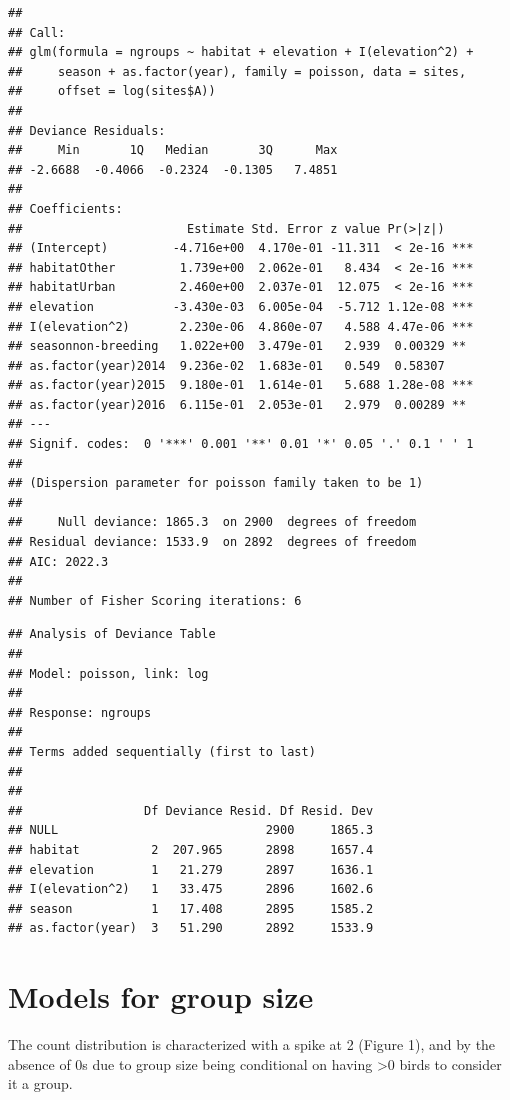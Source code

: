 \documentclass[]{article}
\begin{document}
\begin{verbatim}
## 
## Call:
## glm(formula = ngroups ~ habitat + elevation + I(elevation^2) + 
##     season + as.factor(year), family = poisson, data = sites, 
##     offset = log(sites$A))
## 
## Deviance Residuals: 
##     Min       1Q   Median       3Q      Max  
## -2.6688  -0.4066  -0.2324  -0.1305   7.4851  
## 
## Coefficients:
##                       Estimate Std. Error z value Pr(>|z|)    
## (Intercept)         -4.716e+00  4.170e-01 -11.311  < 2e-16 ***
## habitatOther         1.739e+00  2.062e-01   8.434  < 2e-16 ***
## habitatUrban         2.460e+00  2.037e-01  12.075  < 2e-16 ***
## elevation           -3.430e-03  6.005e-04  -5.712 1.12e-08 ***
## I(elevation^2)       2.230e-06  4.860e-07   4.588 4.47e-06 ***
## seasonnon-breeding   1.022e+00  3.479e-01   2.939  0.00329 ** 
## as.factor(year)2014  9.236e-02  1.683e-01   0.549  0.58307    
## as.factor(year)2015  9.180e-01  1.614e-01   5.688 1.28e-08 ***
## as.factor(year)2016  6.115e-01  2.053e-01   2.979  0.00289 ** 
## ---
## Signif. codes:  0 '***' 0.001 '**' 0.01 '*' 0.05 '.' 0.1 ' ' 1
## 
## (Dispersion parameter for poisson family taken to be 1)
## 
##     Null deviance: 1865.3  on 2900  degrees of freedom
## Residual deviance: 1533.9  on 2892  degrees of freedom
## AIC: 2022.3
## 
## Number of Fisher Scoring iterations: 6
\end{verbatim}

\begin{verbatim}
## Analysis of Deviance Table
## 
## Model: poisson, link: log
## 
## Response: ngroups
## 
## Terms added sequentially (first to last)
## 
## 
##                 Df Deviance Resid. Df Resid. Dev
## NULL                             2900     1865.3
## habitat          2  207.965      2898     1657.4
## elevation        1   21.279      2897     1636.1
## I(elevation^2)   1   33.475      2896     1602.6
## season           1   17.408      2895     1585.2
## as.factor(year)  3   51.290      2892     1533.9
\end{verbatim}

\section{Models for group size}\label{models-for-group-size}

The count distribution is characterized with a spike at 2 (Figure 1),
and by the absence of 0s due to group size being conditional on having
\textgreater{}0 birds to consider it a group.
\end{document}
